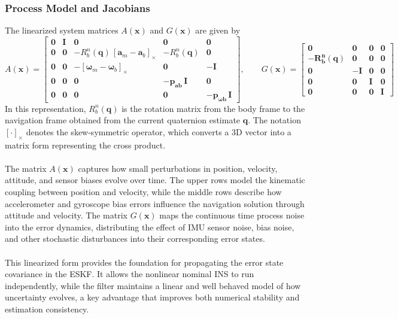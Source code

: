 \subsubsection{Process Model and Jacobians}
The linearized system matrices $A(\mathbf{x})$ and $G(\mathbf{x})$ are given by
\begin{equation}
    A(\mathbf{x}) =
    \begin{bmatrix}
        \mathbf{0} & \mathbf{I} & \mathbf{0} & \mathbf{0} & \mathbf{0} \\
        \mathbf{0} & \mathbf{0} & -R_b^n(\mathbf{q})\,[\mathbf{a}_m - \mathbf{a}_{b}]_\times & -R_b^n(\mathbf{q}) & \mathbf{0} \\
        \mathbf{0} & \mathbf{0} & -[\boldsymbol{\omega}_m - \mathbf{\omega}_b]_\times & \mathbf{0} & -\mathbf{I} \\
        \mathbf{0} & \mathbf{0} & \mathbf{0} & \mathbf{-p_{\mathbf{a}b}\,I} & \mathbf{0} \\
        \mathbf{0} & \mathbf{0} & \mathbf{0} & \mathbf{0} & \mathbf{-p_{\mathbf{\omega}b}\,I}
    \end{bmatrix},
    \qquad
    G(\mathbf{x}) =
    \begin{bmatrix}
        \mathbf{0} & \mathbf{0} & \mathbf{0} & \mathbf{0} \\
        \mathbf{-R_b^n(\mathbf{q})} & \mathbf{0} & \mathbf{0} & \mathbf{0} \\
        \mathbf{0} & \mathbf{-I} & \mathbf{0} & \mathbf{0} \\
        \mathbf{0} & \mathbf{0} & \mathbf{I} & \mathbf{0} \\
        \mathbf{0} & \mathbf{0} & \mathbf{0} & \mathbf{I}
    \end{bmatrix}
    \label{eq:state-estimation-error-state-linear-time-varying-matrices}
\end{equation}
In this representation, $R_b^n(\mathbf{q})$ is the rotation matrix from the body frame to the navigation frame obtained from the current quaternion estimate $\mathbf{q}$. The notation $[\cdot]_\times$ denotes the skew-symmetric operator, which converts a 3D vector into a matrix form representing the cross product.  
\\ \\
The matrix $A(\mathbf{x})$ captures how small perturbations in position, velocity, attitude, and sensor biases evolve over time. The upper rows model the kinematic coupling between position and velocity, while the middle rows describe how accelerometer and gyroscope bias errors influence the navigation solution through attitude and velocity. The matrix $G(\mathbf{x})$ maps the continuous time process noise into the error dynamics, distributing the effect of IMU sensor noise, bias noise, and other stochastic disturbances into their corresponding error states.  
\\ \\
This linearized form provides the foundation for propagating the error state covariance in the ESKF. It allows the nonlinear nominal INS to run independently, while the filter maintains a linear and well behaved model of how uncertainty evolves, a key advantage that improves both numerical stability and estimation consistency.




